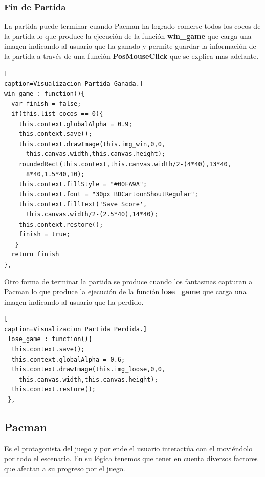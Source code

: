 \subsubsection*{Fin de Partida}
La partida puede terminar cuando Pacman ha logrado comerse todos los cocos de la partida lo que produce la ejecución de la función \textbf{win\_game} que carga una imagen indicando al usuario que ha ganado y permite guardar la información de la partida a través de una función \textbf{PosMouseClick} que se explica mas adelante.
\begin{lstlisting}[
caption=Visualizacion Partida Ganada.]
win_game : function(){
  var finish = false;
  if(this.list_cocos == 0){
    this.context.globalAlpha = 0.9;
    this.context.save();
    this.context.drawImage(this.img_win,0,0,
      this.canvas.width,this.canvas.height);
    roundedRect(this.context,this.canvas.width/2-(4*40),13*40,
      8*40,1.5*40,10);
    this.context.fillStyle = "#00FA9A";
    this.context.font = "30px BDCartoonShoutRegular";
    this.context.fillText('Save Score',
      this.canvas.width/2-(2.5*40),14*40);
    this.context.restore();
    finish = true;
   }
  return finish
},
\end{lstlisting} 
Otro forma de terminar la partida se produce cuando los fantasmas capturan a Pacman lo que produce la ejecución de la función \textbf{lose\_game} que carga una imagen indicando al usuario que ha perdido.
\begin{lstlisting}[
caption=Visualizacion Partida Perdida.]
 lose_game : function(){
  this.context.save();
  this.context.globalAlpha = 0.6;	
  this.context.drawImage(this.img_loose,0,0,
    this.canvas.width,this.canvas.height);
  this.context.restore();
 },
\end{lstlisting} 
\subsection{Pacman}
Es el protagonista del juego y por ende el usuario interactúa con el moviéndolo por todo el
escenario. En su lógica tenemos que tener en cuenta diversos factores que afectan a su progreso
por el juego.
